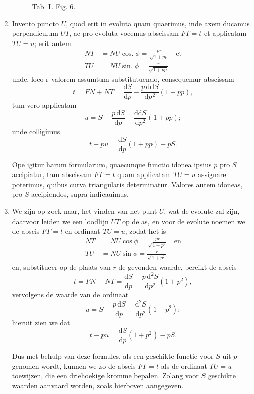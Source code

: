 \documentclass[10pt,a4paper]{article}
\newcommand{\switchenum}{\setcounter{enumi}{\arabic{enumi}-1}\switchcolumn}
\DeclareMathOperator{\sing}{sin.}
\DeclareMathOperator{\cosg}{cos.}
\def\D{\mathrm{d}}
\begin{document}
\begin{paracol}{2}
\begin{enumerate}[topsep=1px]
\begin{figure}[h]
{}
			\selectfont
			\caption{Tab. I. Fig. 6.}
		\end{figure}

		\switchcolumn*
		\newpage
		
		\item Invento puncto $U$, quod erit in evoluta quam quaerimus, inde axem ducamus perpendiculum $UT$, ac pro evoluta vocemus abscissam $FT=t$ et applicatam $TU=u$; erit autem:
		\begin{align*}
			NT &= NU \cosg \phi = \frac{pr}{\sqrt{1+pp}} \quad \text{et}\\
			TU &= NU \sing \phi = \frac{r}{\sqrt{1+pp}}
		\end{align*}
		unde, loco r valorem assumtum substitutuendo, consequemur abscissam
		\[
			t = FN + NT = \frac{\D S}{\D p} - \frac{p\,\D\D S}{\D p^2} (1+pp),
		\]
		tum vero applicatam
		\[
			u = S - \frac{p\, \D S}{\D p}-\frac{\D \D S}{\D p^2}(1+pp);
		\]
		unde colligimus
		\[
			t-pu = \frac{\D S}{\D p}(1+pp)-pS.
		\]
		\par Ope igitur harum formularum, quaecunque functio idonea ipsius $p$ pro $S$ accipiatur, tam abscissam $FT = t$ quam applicatam $TU=u$ assignare poterimus, quibus curva triangularis determinatur. Valores autem idoneas, pro $S$ accipiendos, supra indicauimus.
		
		\switchenum
		\newpage
		\item We zijn op zoek naar, het vinden van het punt $U$, wat de evolute zal zijn, daarvoor leiden we een loodlijn $UT$ op de as, en voor de evolute noemen we de abscis $FT=t$ en ordinaat $TU=u$, zodat het is
		\begin{align*}
			NT &= NU \cos \phi = \frac{pr}{\sqrt{1+p^2}} \quad \text{en}\\
			TU &= NU \sin \phi = \frac{r}{\sqrt{1+p^2}}
		\end{align*}
		en, substitueer op de plaats van $r$ de gevonden waarde, bereikt de abscis
		\[
			t = FN + NT = \frac{\D S}{\D p} - \frac{p\,\D^2 S}{\D p^2} (1+p^2),
		\]
		vervolgens de waarde van de ordinaat
		\[
			u = S - \frac{p\, \D S}{\D p}-\frac{\D^2 S}{\D p^2}(1+p^2);
		\]
		hieruit zien we dat
		\[
			t-pu = \frac{\D S}{\D p}(1+p^2)-pS.
		\]
		\par Dus met behulp van deze formules, als een geschikte functie voor $S$ uit $p$ genomen wordt, kunnen we zo de abscis $FT=t$ als de ordinaat $TU=u$ toewijzen, die een driehoekige kromme bepalen. Zolang voor $S$ geschikte waarden aanvaard worden, zoals hierboven aangegeven.
		

\end{enumerate}
\end{paracol}
\end{document}
